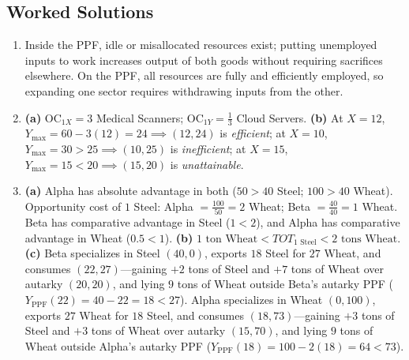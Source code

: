 \documentclass[11pt,letterpaper]{article}
\begin{document}
\subsection*{Worked Solutions}
\begin{enumerate}
    \item Inside the PPF, idle or misallocated resources exist; putting unemployed inputs to work increases output of both goods without requiring sacrifices elsewhere. On the PPF, all resources are fully and efficiently employed, so expanding one sector requires withdrawing inputs from the other.
    \item \textbf{(a)} $\text{OC}_{1X} = 3$ Medical Scanners; $\text{OC}_{1Y} = \frac{1}{3}$ Cloud Servers. \textbf{(b)} At $X = 12$, $Y_{\max} = 60 - 3(12) = 24 \implies (12, 24)$ is \emph{efficient}; at $X = 10$, $Y_{\max} = 30 > 25 \implies (10, 25)$ is \emph{inefficient}; at $X = 15$, $Y_{\max} = 15 < 20 \implies (15, 20)$ is \emph{unattainable}.
    \item \textbf{(a)} Alpha has absolute advantage in both ($50 > 40$ Steel; $100 > 40$ Wheat). Opportunity cost of $1$ Steel: Alpha $= \frac{100}{50} = 2$ Wheat; Beta $= \frac{40}{40} = 1$ Wheat. Beta has comparative advantage in Steel ($1 < 2$), and Alpha has comparative advantage in Wheat ($0.5 < 1$). \textbf{(b)} $1\text{ ton Wheat} < TOT_{1\text{ Steel}} < 2\text{ tons Wheat}$. \textbf{(c)} Beta specializes in Steel $(40, 0)$, exports $18$ Steel for $27$ Wheat, and consumes $(22, 27)$—gaining $+2$ tons of Steel and $+7$ tons of Wheat over autarky $(20, 20)$, and lying $9$ tons of Wheat outside Beta's autarky PPF ($Y_{\text{PPF}}(22) = 40 - 22 = 18 < 27$). Alpha specializes in Wheat $(0, 100)$, exports $27$ Wheat for $18$ Steel, and consumes $(18, 73)$—gaining $+3$ tons of Steel and $+3$ tons of Wheat over autarky $(15, 70)$, and lying $9$ tons of Wheat outside Alpha's autarky PPF ($Y_{\text{PPF}}(18) = 100 - 2(18) = 64 < 73$).
\end{enumerate}
\end{document}
